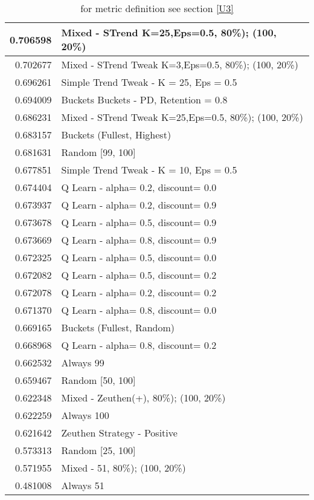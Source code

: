 \begin{table}[!hbtp]
\begin{footnotesize}
\begin{tabular}{|r|l|}
0.706598 & Mixed - {STrend K=25,Eps=0.5, 80\%); (100, 20\%)}\\ \hline
0.702677 & Mixed - {STrend Tweak K=3,Eps=0.5, 80\%); (100, 20\%)}\\ \hline
0.696261 & Simple Trend Tweak - K = 25, Eps = 0.5\\ \hline
0.694009 & Buckets Buckets - PD, Retention = 0.8\\ \hline
0.686231 & Mixed - {STrend Tweak K=25,Eps=0.5, 80\%); (100, 20\%)}\\ \hline
0.683157 & Buckets (Fullest, Highest)\\ \hline
0.681631 & Random [99, 100]\\ \hline
0.677851 & Simple Trend Tweak - K = 10, Eps = 0.5\\ \hline
0.674404 & Q Learn - alpha= 0.2, discount= 0.0\\ \hline
0.673937 & Q Learn - alpha= 0.2, discount= 0.9\\ \hline
0.673678 & Q Learn - alpha= 0.5, discount= 0.9\\ \hline
0.673669 & Q Learn - alpha= 0.8, discount= 0.9\\ \hline
0.672325 & Q Learn - alpha= 0.5, discount= 0.0\\ \hline
0.672082 & Q Learn - alpha= 0.5, discount= 0.2\\ \hline
0.672078 & Q Learn - alpha= 0.2, discount= 0.2\\ \hline
0.671370 & Q Learn - alpha= 0.8, discount= 0.0\\ \hline
0.669165 & Buckets (Fullest, Random)\\ \hline
0.668968 & Q Learn - alpha= 0.8, discount= 0.2\\ \hline
0.662532 & Always 99\\ \hline
0.659467 & Random [50, 100]\\ \hline
0.622348 & Mixed - {Zeuthen(+), 80\%); (100, 20\%)}\\ \hline
0.622259 & Always 100\\ \hline
0.621642 & Zeuthen Strategy - Positive\\ \hline
0.573313 & Random [25, 100]\\ \hline
0.571955 & Mixed - {51, 80\%); (100, 20\%)}\\ \hline
0.481008 & Always 51\\ \hline
\end{tabular}
\caption{for metric definition see section \eqref{U3}}
\end{footnotesize}
\end{table}

